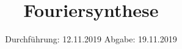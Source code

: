 

\subject{V802}
\title{Fouriersynthese}
\date{%
  Durchführung: 12.11.2019
  \hspace{3em}
  Abgabe: 19.11.2019
}



\maketitle
\thispagestyle{empty}
\tableofcontents
\newpage





\printbibliography{}



